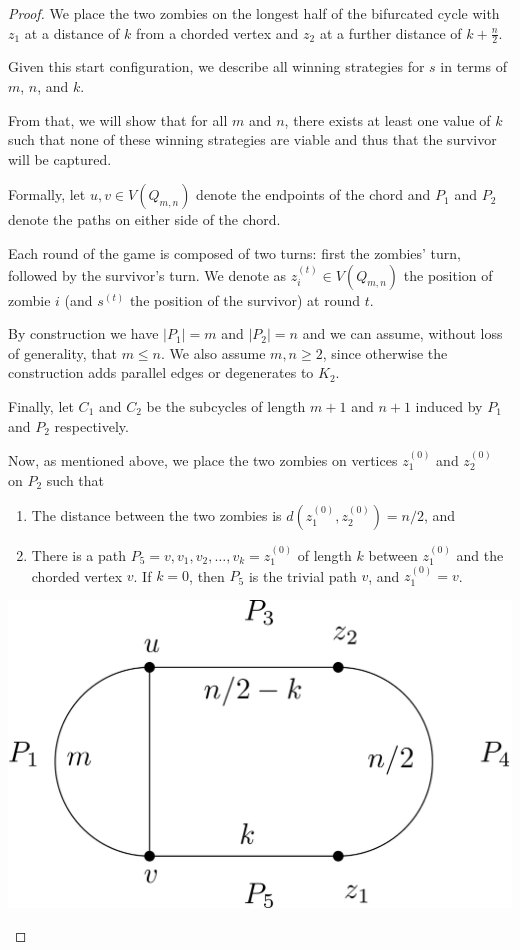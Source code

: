 \documentclass[letterpaper, 10pt]{article}
\begin{document}
\begin{proof}
We place the two zombies on the longest half of the bifurcated cycle with $z_1$ at a distance of $k$
from a chorded vertex and $z_2$ at a further distance of $k + \frac{n}{2}$.

Given this start configuration, we describe all winning strategies for $s$ in terms of
$m$, $n$, and $k$.

From that, we will show that for all $m$ and $n$, there exists at least one value of $k$ such that
none of these winning strategies are viable and thus that the survivor will be captured.

Formally, let $u,v \in V(Q_{m,n})$ denote the endpoints of the
chord and $P_1$ and $P_2$ denote the paths on either side of the chord.

Each round of the game is composed of two turns: first the zombies' turn, followed by the
survivor's turn. We denote as $z_i^{(t)} \in V(Q_{m,n})$ the position of zombie $i$
(and $s^{(t)}$ the position of the survivor) at round $t$.

By construction we have $\lvert P_1 \rvert = m$ and $\lvert P_2 \rvert = n$ and we
can assume, without loss of generality, that $m \leq n$. We also assume $m,n \geq 2$, since
otherwise the construction adds parallel edges or degenerates to $K_2$.

Finally, let $C_1$ and $C_2$ be the subcycles of length $m+1$ and $n+1$ induced by
$P_1$ and $P_2$ respectively.

Now, as mentioned above, we place the two zombies on vertices $z_1^{(0)}$ and $z_2^{(0)}$ on $P_2$ such that

\begin{enumerate}
\item The distance between the two zombies is $d(z_1^{(0)}, z_2^{(0)}) = n/2$,  and
\item There is a path $P_5 = v, v_1, v_2, \dots, v_k = z_1^{(0)}$ of length $k$ between $z_1^{(0)}$ and
    the chorded vertex $v$.
    If $k=0$, then $P_5$ is the trivial path $v$, and $z_1^{(0)} = v$.
\end{enumerate}

\begin{center}
\includegraphics[scale=0.15]{diagram1.png}
\end{center}


\end{proof}
\end{document}
